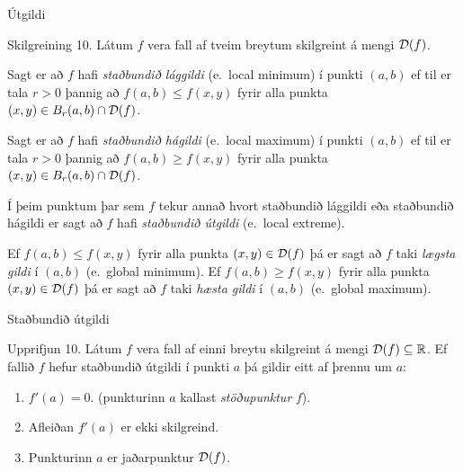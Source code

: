 \def \kaflanr {10}
\lecture[\kaflanr]{\kaflanr. Útgildi}{lecture-text}
\date{4.~febrúar 2015}



\begin{frame}
	\maketitle
\end{frame}



\begin{frame}{Útgildi} 

\begin {block}{Skilgreining \kaflanr.}
 Látum $f$ vera fall af tveim breytum
skilgreint á mengi ${\cal D}(f)$.  

\medskip
Sagt er að $f$ hafi {\em \color{red} staðbundið
  lággildi} (e.~local minimum) í punkti $(a,b)$ ef til er tala $r>0$ þannig að 
$f(a,b)\leq f(x,y)$ fyrir alla punkta $(x,y)\in B_r(a,b)\cap{\cal
  D}(f)$.

\medskip
Sagt er að $f$ hafi {\em \color{red} staðbundið
  hágildi}  (e.~local maximum) í punkti $(a,b)$ ef til er tala $r>0$ þannig að 
$f(a,b)\geq f(x,y)$ fyrir alla punkta $(x,y)\in B_r(a,b)\cap{\cal
  D}(f)$.

\medskip
Í þeim punktum þar sem $f$ tekur annað hvort staðbundið lággildi eða
staðbundið hágildi er sagt að $f$ hafi {\em \color{red} staðbundið útgildi}
(e.~local extreme). 


\medskip
Ef $f(a,b)\leq f(x,y)$ fyrir alla punkta $(x,y)\in {\cal D}(f)$ þá er
sagt að $f$ taki {\em \color{red} lægsta gildi} í $(a,b)$ (e.~global minimum).
Ef $f(a,b)\geq f(x,y)$ fyrir alla punkta $(x,y)\in {\cal D}(f)$ þá er
sagt að $f$ taki {\em \color{red} hæsta gildi} í $(a,b)$ (e.~global maximum).

\end{block}

\end{frame}


\begin{frame}{Staðbundið útgildi} 

\begin {block}{Upprifjun \kaflanr.}
   Látum $f$ vera fall af einni breytu
skilgreint á mengi ${\cal D}(f)\subseteq {\mathbb R}$.  Ef fallið $f$ hefur
staðbundið útgildi í punkti $a$ þá gildir eitt af þrennu um $a$:

\begin {enumerate}
 \item $f'(a)=0$. \qquad (punkturinn $a$ kallast {\em \color{red} stöðupunktur} $f$).
 \item Afleiðan $f'(a)$ er ekki skilgreind.
 \item   Punkturinn $a$ er jaðarpunktur ${\cal D}(f)$.
\end {enumerate}

\end{block}

\end{frame}


